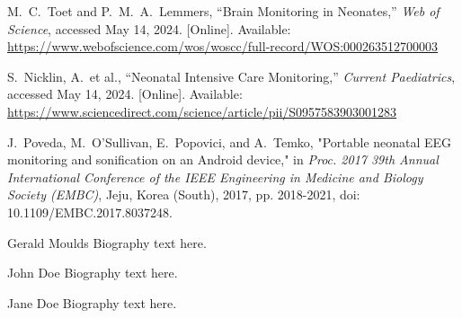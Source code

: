 \documentclass[12pt,journal,compsoc]{IEEEtran}
\begin{document}

\begin{thebibliography}{1}

M.~C.~Toet and P.~M.~A.~Lemmers, “Brain Monitoring in Neonates,” \emph{Web of Science}, accessed May 14, 2024. [Online]. Available: \url{https://www.webofscience.com/wos/woscc/full-record/WOS:000263512700003}

S.~Nicklin, A.~et al., “Neonatal Intensive Care Monitoring,” \emph{Current Paediatrics}, accessed May 14, 2024. [Online]. Available: \url{https://www.sciencedirect.com/science/article/pii/S0957583903001283}

J.~Poveda, M.~O'Sullivan, E.~Popovici, and A.~Temko, "Portable neonatal EEG monitoring and sonification on an Android device," in \emph{Proc. 2017 39th Annual International Conference of the IEEE Engineering in Medicine and Biology Society (EMBC)}, Jeju, Korea (South), 2017, pp. 2018-2021, doi: 10.1109/EMBC.2017.8037248.

\end{thebibliography}


\begin{IEEEbiography}{Gerald Moulds}
Biography text here.
\end{IEEEbiography}

\begin{IEEEbiographynophoto}{John Doe}
Biography text here.
\end{IEEEbiographynophoto}

\begin{IEEEbiographynophoto}{Jane Doe}
Biography text here.
\end{IEEEbiographynophoto}
\end{document}

